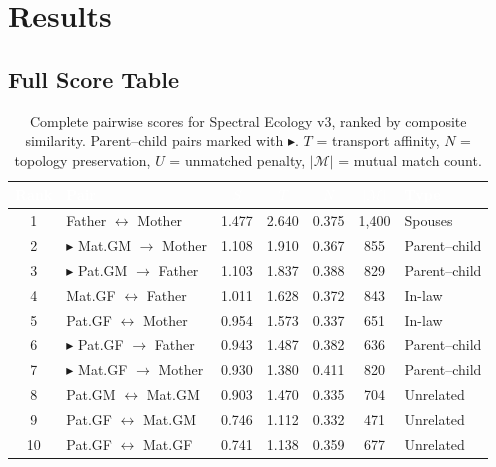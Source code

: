 \documentclass{../yalumba}
\begin{document}
\section{Results}
\label{sec:results}

\subsection{Full Score Table}

\begin{table}[H]
  \centering
  \tablestyle
  \caption{Complete pairwise scores for Spectral Ecology v3, ranked by
    composite similarity.  Parent--child pairs marked with
    $\blacktriangleright$.  $T$ = transport affinity, $N$ = topology
    preservation, $U$ = unmatched penalty, $|\mathcal{M}|$ = mutual match
    count.}
  \label{tab:scores}
  \begin{tabular}{clccccl}
    \toprule
    \rowcolor{table-header}
    \textcolor{white}{\textbf{Rank}} &
    \textcolor{white}{\textbf{Pair}} &
    \textcolor{white}{\textbf{$S$}} &
    \textcolor{white}{\textbf{$T$}} &
    \textcolor{white}{\textbf{$N$}} &
    \textcolor{white}{\textbf{$|\mathcal{M}|$}} &
    \textcolor{white}{\textbf{Type}} \\
    \midrule
    1 & Father $\leftrightarrow$ Mother
      & 1.477 & 2.640 & 0.375 & 1{,}400 & Spouses \\
    2 & $\blacktriangleright$ Mat.GM $\to$ Mother
      & 1.108 & 1.910 & 0.367 & 855 & Parent--child \\
    3 & $\blacktriangleright$ Pat.GM $\to$ Father
      & 1.103 & 1.837 & 0.388 & 829 & Parent--child \\
    4 & Mat.GF $\leftrightarrow$ Father
      & 1.011 & 1.628 & 0.372 & 843 & In-law \\
    5 & Pat.GF $\leftrightarrow$ Mother
      & 0.954 & 1.573 & 0.337 & 651 & In-law \\
    6 & $\blacktriangleright$ Pat.GF $\to$ Father
      & 0.943 & 1.487 & 0.382 & 636 & Parent--child \\
    7 & $\blacktriangleright$ Mat.GF $\to$ Mother
      & 0.930 & 1.380 & 0.411 & 820 & Parent--child \\
    8 & Pat.GM $\leftrightarrow$ Mat.GM
      & 0.903 & 1.470 & 0.335 & 704 & Unrelated \\
    9 & Pat.GF $\leftrightarrow$ Mat.GM
      & 0.746 & 1.112 & 0.332 & 471 & Unrelated \\
    10 & Pat.GF $\leftrightarrow$ Mat.GF
      & 0.741 & 1.138 & 0.359 & 677 & Unrelated \\
    \bottomrule
  \end{tabular}
\end{table}
\end{document}
